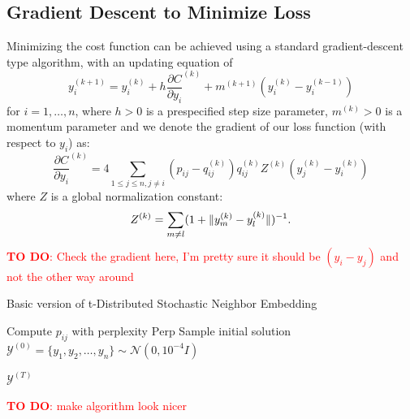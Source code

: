 \subsection{Gradient Descent to Minimize Loss}
Minimizing the cost function can be achieved using a standard gradient-descent type algorithm, with an updating equation of 
\begin{equation}
    y_i^{(k+1)} = y_i^{(k)} + h \frac{\partial C}{\partial y_i}^{(k)} + m^{(k+1)}(y_i^{(k)} - y_i^{(k-1)}) 
\end{equation}
for $i=1,\dots,n$, where $h >0$ is a prespecified step size parameter, $m^{(k)} > 0$ is a momentum parameter and we denote the gradient of our loss function (with respect to $y_i$) as: 
\begin{equation}
    \frac{\partial C}{\partial y_i}^{(k)} = 4 \sum_{1 \leq j \leq n, j \neq i} (p_{ij} - q_{ij}^{(k)}) q_{ij}^{(k)} Z^{(k)} (y_j^{(k)} - y_i^{(k)})
\end{equation}
where $Z$ is a global normalization constant: 
\begin{equation}
    Z^{(k)} = \sum_{m \neq l} (1 + \lVert y_m^{(k)} - y_l^{(k)}\rVert)^{-1}. 
\end{equation}
\textcolor{red}{\textbf{TO DO}: Check the gradient here, I'm pretty sure it should be $(y_i - y_j)$ and not the other way around}


\begin{algorithm}[H]
    \caption{Basic version of t-Distributed Stochastic Neighbor Embedding}
    \label{alg:tsne}


    Compute $p_{ij}$ with perplexity $\text{Perp}$ \;
    Sample initial solution $\mathcal{Y}^{(0)} = \{y_1, y_2, \dots, y_n\} \sim \mathcal{N}(0, 10^{-4} I)$\


    \Return $\mathcal{Y}^{(T)}$\
\end{algorithm}
\textcolor{red}{\textbf{TO DO}: make algorithm look nicer}

